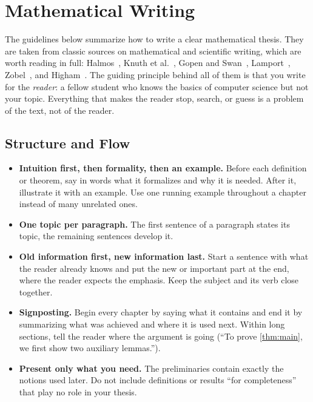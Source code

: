 \chapter{Mathematical Writing}\label{app:mathematical-writing}

The guidelines below summarize how to write a clear mathematical thesis.
They are taken from classic sources on mathematical and scientific writing,
which are worth reading in full:
Halmos~\cite{halmos1970HowWriteMathematics},
Knuth et al.~\cite{knuth1989MathematicalWriting},
Gopen and Swan~\cite{gopen1990ScienceScientificWriting},
Lamport~\cite{lamport2012HowWrite21st},
Zobel~\cite{zobel2014WritingComputerScience}, and
Higham~\cite{higham2020HandbookWritingMathematical}.
The guiding principle behind all of them is that you write for the
\emph{reader}: a fellow student who knows the basics of computer science
but not your topic.
Everything that makes the reader stop, search, or guess is a problem of the
text, not of the reader.

\section{Structure and Flow}\label{sec:mw-structure}

\begin{itemize}
    \item \textbf{Intuition first, then formality, then an example.}
          Before each definition or theorem, say in words what it formalizes
          and why it is needed.
          After it, illustrate it with an example.
          Use one running example throughout a chapter instead of many
          unrelated ones.
    \item \textbf{One topic per paragraph.}
          The first sentence of a paragraph states its topic, the remaining
          sentences develop it.
    \item \textbf{Old information first, new information last.}
          Start a sentence with what the reader already knows and put the new
          or important part at the end, where the reader expects the emphasis.
          Keep the subject and its verb close together.
    \item \textbf{Signposting.}
          Begin every chapter by saying what it contains and end it by
          summarizing what was achieved and where it is used next.
          Within long sections, tell the reader where the argument is going
          (``To prove \cref{thm:main}, we first show two auxiliary lemmas.'').
    \item \textbf{Present only what you need.}
          The preliminaries contain exactly the notions used later.
          Do not include definitions or results ``for completeness'' that
          play no role in your thesis.
\end{itemize}


